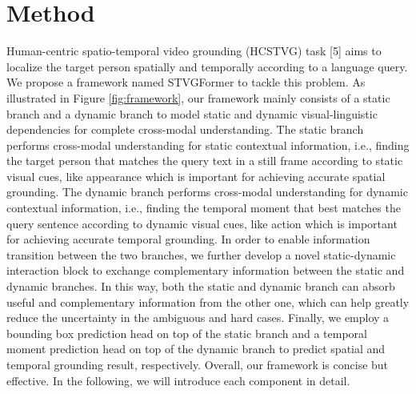 \documentclass[sigconf]{acmart}
\begin{document}
\section{Method}
Human-centric spatio-temporal video grounding (HCSTVG) task [5] aims to localize the target person spatially and temporally according to a language query. We propose a framework named STVGFormer to tackle this problem. As illustrated in Figure \ref{fig:framework}, our framework mainly consists of a static branch and a dynamic branch to model static and dynamic visual-linguistic dependencies for complete cross-modal understanding. The static branch performs cross-modal understanding for static contextual information, i.e., finding the target person that matches the query text in a still frame according to static visual cues, like appearance which is important for achieving accurate spatial grounding. The dynamic branch performs cross-modal understanding for dynamic contextual information, i.e., finding the temporal moment that best matches the query sentence according to dynamic visual cues, like action which is important for achieving accurate temporal grounding. In order to enable information transition between the two branches, we further develop a novel static-dynamic interaction block to exchange complementary information between the static and dynamic branches. In this way, both the static and dynamic branch can absorb useful and complementary information from the other one, which can help greatly reduce the uncertainty in the ambiguous and hard cases. Finally, we employ a bounding box prediction head on top of the static branch and a temporal moment prediction head on top of the dynamic branch to predict spatial and temporal grounding result, respectively. Overall, our framework is concise but effective. In the following, we will introduce each component in detail. 
\end{document}
